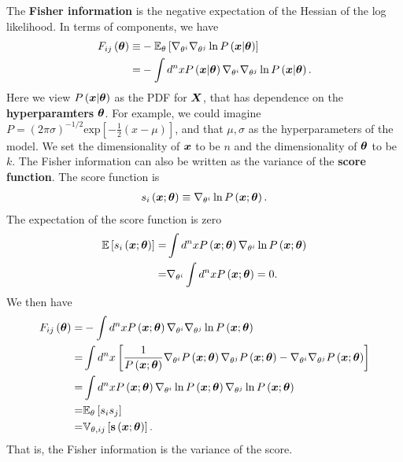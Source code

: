 The \textbf{Fisher information} is the negative expectation of the Hessian
of the log likelihood. In terms of components, we have
\begin{align}
    \label{eq:Fisher-information}
    F_{ij}\left({\bm \theta}\right) 
    \equiv&
    -
    \mathbb{E}_{\theta}\left[
        \nabla_{\theta^i}\nabla_{\theta^j}\ln P\left({\bm x}|{\bm \theta}\right)
        \right]
    \nonumber\\
    =&
    -
    \int d^nx P\left({\bm x}|{\bm \theta}\right)
        \nabla_{\theta^i}\nabla_{\theta^j}\ln P\left({\bm x}|{\bm \theta}\right)
    .
\end{align}
Here we view $P\left({\bm x}|{\bm \theta}\right)$ as the PDF for ${\bm X}$, that has dependence
on the \textbf{hyperparamters} ${\bm \theta}$.
For example, we could imagine 
$P = \left(2\pi \sigma\right)^{-1/2} \mathrm{exp}\left[-\frac{1}{2}\left(x-\mu\right)\right]$,
and that $\mu,\sigma$ as the hyperparameters of the model.
We set the dimensionality of ${\bm x}$ to be $n$ and the dimensionality of ${\bm \theta}$ to be $k$.
The Fisher information can also be written as the variance of the \textbf{score function}.
The score function is
\begin{align}
    \label{eq:score-def}
    s_i\left({\bm x};{\bm \theta}\right)
    \equiv
    \nabla_{\theta^i}\ln P\left({\bm x};{\bm \theta}\right)
    .
\end{align}
The expectation of the score function is zero
\begin{align}
    \mathbb{E}\left[s_i\left({\bm x};{\bm \theta}\right)\right]
    =&
    \int d^nx P\left({\bm x};{\bm \theta}\right) 
        \nabla_{\theta^i}\ln P\left({\bm x};{\bm \theta}\right) 
    \nonumber\\
    =&
    \nabla_{\theta^i}
    \int d^nx  
        P\left({\bm x};{\bm \theta}\right)
    =
    0
    .
\end{align}
We then have
\begin{align}
    \label{eq:fisher-variance-score}
    F_{ij}\left({\bm \theta}\right)
    =&
    -
    \int d^nx P\left({\bm x};{\bm \theta}\right)
        \nabla_{\theta^i}\nabla_{\theta^j}\ln P\left({\bm x};{\bm \theta}\right)
    \nonumber\\
    =&
    \int d^nx\left[
        \frac{1}{P\left({\bm x};{\bm \theta}\right)}
        \nabla_{\theta^i}P\left({\bm x};{\bm \theta}\right)
        \nabla_{\theta^j}P\left({\bm x};{\bm \theta}\right)
        -
        \nabla_{\theta^i}\nabla_{\theta^j}P\left({\bm x};{\bm \theta}\right)
    \right]
    \nonumber\\
    =&
    \int d^nx
        P\left({\bm x};{\bm \theta}\right)
        \nabla_{\theta^i}\ln P\left({\bm x};{\bm \theta}\right)
        \nabla_{\theta^j}\ln P\left({\bm x};{\bm \theta}\right)
    \nonumber\\
    =&
    \mathbb{E}_{\theta}\left[s_is_j\right]
    \nonumber\\
    =&
    \mathbb{V}_{\theta,ij}\left[
        {\bf s}\left({\bm x};{\bm \theta}\right)
    \right]
    .
\end{align}
That is, the Fisher information is the variance of the score.

